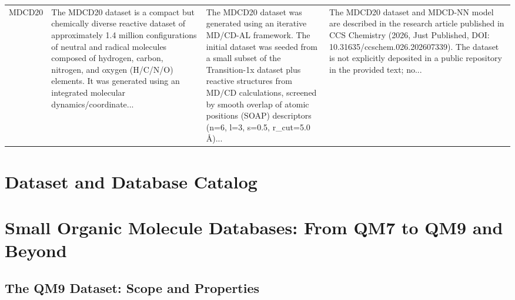 \documentclass[12pt]{article}
\begin{document}
\begin{longtable}{p{}p{}p{}p{}}
MDCD20 \cite{ds50-1} & The MDCD20 dataset is a compact but chemically diverse reactive dataset of approximately 1.4 million configurations of neutral and radical molecules composed of hydrogen, carbon, nitrogen, and oxygen (H/C/N/O) elements. It was generated using an integrated molecular dynamics/coordinate... & The MDCD20 dataset was generated using an iterative MD/CD-AL framework. The initial dataset was seeded from a small subset of the Transition-1x dataset plus reactive structures from MD/CD calculations, screened by smooth overlap of atomic positions (SOAP) descriptors (n=6, l=3, s=0.5, r\_cut=5.0 Å)... & The MDCD20 dataset and MDCD-NN model are described in the research article published in CCS Chemistry (2026, Just Published, DOI: 10.31635/ccschem.026.202607339). The dataset is not explicitly deposited in a public repository in the provided text; no... \cite{ds50-1,ds50-2} \\
\end{longtable}
\normalsize



\section{Dataset and Database Catalog}

\section{Small Organic Molecule Databases: From QM7 to QM9 and Beyond}

\subsection{The QM9 Dataset: Scope and Properties}
\end{document}
